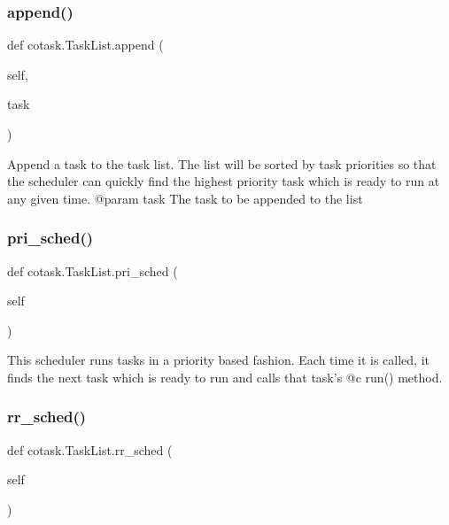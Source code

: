 \subsubsection{\texorpdfstring{append()}{append()}}
{\footnotesize\ttfamily def cotask.\+Task\+List.\+append (\begin{DoxyParamCaption}\item[{}]{self,  }\item[{}]{task }\end{DoxyParamCaption})}

\begin{DoxyVerb}Append a task to the task list. The list will be sorted by task 
priorities so that the scheduler can quickly find the highest priority
task which is ready to run at any given time. 
@param task The task to be appended to the list \end{DoxyVerb}
 \mbox{\label{classcotask_1_1_task_list_a5f7b264614e8e22c28d4c1509e3f30d8}} 
\subsubsection{\texorpdfstring{pri\_sched()}{pri\_sched()}}
{\footnotesize\ttfamily def cotask.\+Task\+List.\+pri\+\_\+sched (\begin{DoxyParamCaption}\item[{}]{self }\end{DoxyParamCaption})}

\begin{DoxyVerb}This scheduler runs tasks in a priority based fashion. Each time 
it is called, it finds the next task which is ready to run and calls 
that task's @c run() method. \end{DoxyVerb}
 \mbox{\label{classcotask_1_1_task_list_a01614098aedc87b465d5525c6ccb47ce}} 
\subsubsection{\texorpdfstring{rr\_sched()}{rr\_sched()}}
{\footnotesize\ttfamily def cotask.\+Task\+List.\+rr\+\_\+sched (\begin{DoxyParamCaption}\item[{}]{self }\end{DoxyParamCaption})}

